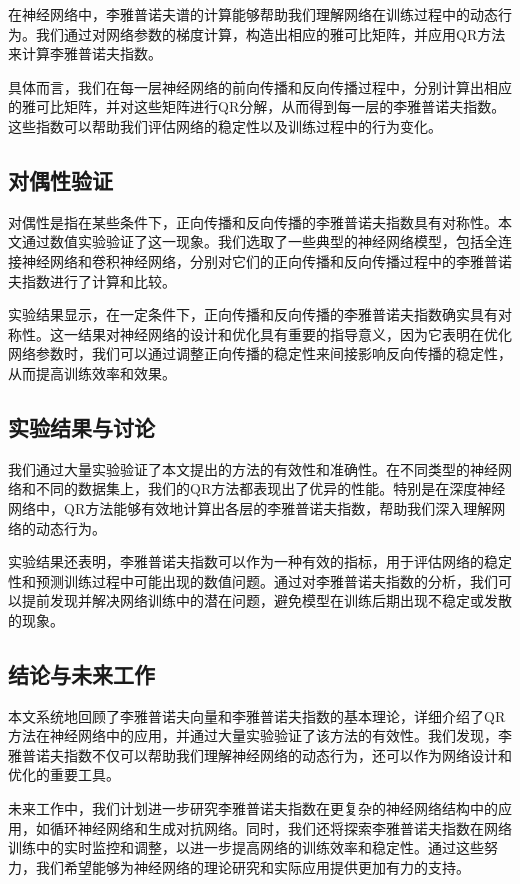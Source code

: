 在神经网络中，李雅普诺夫谱的计算能够帮助我们理解网络在训练过程中的动态行为。我们通过对网络参数的梯度计算，构造出相应的雅可比矩阵，并应用QR方法来计算李雅普诺夫指数。

具体而言，我们在每一层神经网络的前向传播和反向传播过程中，分别计算出相应的雅可比矩阵，并对这些矩阵进行QR分解，从而得到每一层的李雅普诺夫指数。这些指数可以帮助我们评估网络的稳定性以及训练过程中的行为变化。

\subsection{对偶性验证}

对偶性是指在某些条件下，正向传播和反向传播的李雅普诺夫指数具有对称性。本文通过数值实验验证了这一现象。我们选取了一些典型的神经网络模型，包括全连接神经网络和卷积神经网络，分别对它们的正向传播和反向传播过程中的李雅普诺夫指数进行了计算和比较。

实验结果显示，在一定条件下，正向传播和反向传播的李雅普诺夫指数确实具有对称性。这一结果对神经网络的设计和优化具有重要的指导意义，因为它表明在优化网络参数时，我们可以通过调整正向传播的稳定性来间接影响反向传播的稳定性，从而提高训练效率和效果。

\subsection{实验结果与讨论}

我们通过大量实验验证了本文提出的方法的有效性和准确性。在不同类型的神经网络和不同的数据集上，我们的QR方法都表现出了优异的性能。特别是在深度神经网络中，QR方法能够有效地计算出各层的李雅普诺夫指数，帮助我们深入理解网络的动态行为。

实验结果还表明，李雅普诺夫指数可以作为一种有效的指标，用于评估网络的稳定性和预测训练过程中可能出现的数值问题。通过对李雅普诺夫指数的分析，我们可以提前发现并解决网络训练中的潜在问题，避免模型在训练后期出现不稳定或发散的现象。

\subsection{结论与未来工作}

本文系统地回顾了李雅普诺夫向量和李雅普诺夫指数的基本理论，详细介绍了QR方法在神经网络中的应用，并通过大量实验验证了该方法的有效性。我们发现，李雅普诺夫指数不仅可以帮助我们理解神经网络的动态行为，还可以作为网络设计和优化的重要工具。

未来工作中，我们计划进一步研究李雅普诺夫指数在更复杂的神经网络结构中的应用，如循环神经网络和生成对抗网络。同时，我们还将探索李雅普诺夫指数在网络训练中的实时监控和调整，以进一步提高网络的训练效率和稳定性。通过这些努力，我们希望能够为神经网络的理论研究和实际应用提供更加有力的支持。
